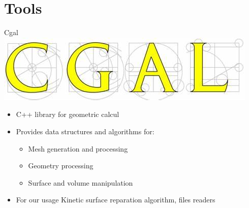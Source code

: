 \documentclass[10pt]{beamer}
\begin{document}
\section{Tools}
\begin{frame}{Cgal}
    \includegraphics[scale = 0.2]{../../images/CGAL_logo.png}
    \begin{itemize}
        \item C++ library for geometric calcul 
        \item Provides data structures and algorithms for:
        \begin{itemize}
            \item Mesh generation and processing
            \item Geometry processing
            \item Surface and volume manipulation
        \end{itemize}
        \item For our usage Kinetic surface reparation algorithm, files readers
    \end{itemize}
\end{frame}
\end{document}
